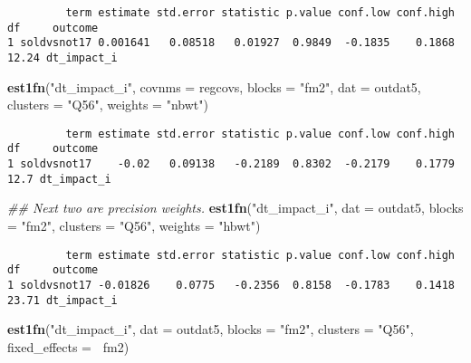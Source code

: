 \documentclass[11pt,]{article}
\newenvironment{Shaded}{\begin{snugshade}}{\end{snugshade}}
\newcommand{\CommentTok}[1]{\textcolor[rgb]{0.56,0.35,0.01}{\textit{#1}}}
\newcommand{\DataTypeTok}[1]{\textcolor[rgb]{0.13,0.29,0.53}{#1}}
\newcommand{\KeywordTok}[1]{\textcolor[rgb]{0.13,0.29,0.53}{\textbf{#1}}}
\newcommand{\NormalTok}[1]{#1}
\newcommand{\OperatorTok}[1]{\textcolor[rgb]{0.81,0.36,0.00}{\textbf{#1}}}
\newcommand{\StringTok}[1]{\textcolor[rgb]{0.31,0.60,0.02}{#1}}
\begin{document}
\begin{verbatim}
         term estimate std.error statistic p.value conf.low conf.high    df     outcome
1 soldvsnot17 0.001641   0.08518   0.01927  0.9849  -0.1835    0.1868 12.24 dt_impact_i
\end{verbatim}

\begin{Shaded}
\begin{Highlighting}[]
\KeywordTok{est1fn}\NormalTok{(}\StringTok{"dt_impact_i"}\NormalTok{, }\DataTypeTok{covnms =}\NormalTok{ regcovs, }\DataTypeTok{blocks =} \StringTok{"fm2"}\NormalTok{, }\DataTypeTok{dat =}\NormalTok{ outdat5, }\DataTypeTok{clusters =} \StringTok{"Q56"}\NormalTok{, }\DataTypeTok{weights =} \StringTok{"nbwt"}\NormalTok{)}
\end{Highlighting}
\end{Shaded}

\begin{verbatim}
         term estimate std.error statistic p.value conf.low conf.high   df     outcome
1 soldvsnot17    -0.02   0.09138   -0.2189  0.8302  -0.2179    0.1779 12.7 dt_impact_i
\end{verbatim}

\begin{Shaded}
\begin{Highlighting}[]
\CommentTok{## Next two are precision weights.}
\KeywordTok{est1fn}\NormalTok{(}\StringTok{"dt_impact_i"}\NormalTok{, }\DataTypeTok{dat =}\NormalTok{ outdat5, }\DataTypeTok{blocks =} \StringTok{"fm2"}\NormalTok{, }\DataTypeTok{clusters =} \StringTok{"Q56"}\NormalTok{, }\DataTypeTok{weights =} \StringTok{"hbwt"}\NormalTok{)}
\end{Highlighting}
\end{Shaded}

\begin{verbatim}
         term estimate std.error statistic p.value conf.low conf.high    df     outcome
1 soldvsnot17 -0.01826    0.0775   -0.2356  0.8158  -0.1783    0.1418 23.71 dt_impact_i
\end{verbatim}

\begin{Shaded}
\begin{Highlighting}[]
\KeywordTok{est1fn}\NormalTok{(}\StringTok{"dt_impact_i"}\NormalTok{, }\DataTypeTok{dat =}\NormalTok{ outdat5, }\DataTypeTok{blocks =} \StringTok{"fm2"}\NormalTok{, }\DataTypeTok{clusters =} \StringTok{"Q56"}\NormalTok{, }\DataTypeTok{fixed_effects =} \OperatorTok{~}\NormalTok{fm2)}
\end{Highlighting}
\end{Shaded}
\end{document}

